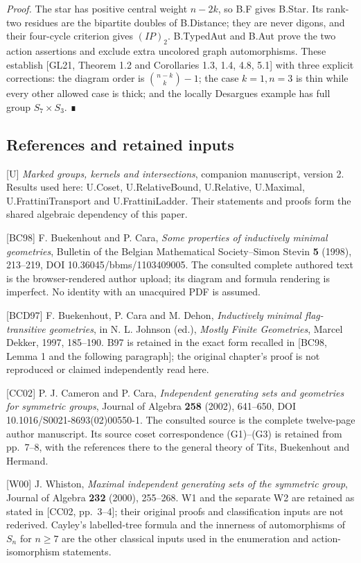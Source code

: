 \documentclass[
  11pt,
  a4paper,
]{article}
\begin{document}
\emph{Proof.} The star has positive central weight \(n-2k\), so B.F
gives B.Star. Its rank-two residues are the bipartite doubles of
B.Distance; they are never digons, and their four-cycle criterion gives
\((IP)_2\). B.TypedAut and B.Aut prove the two action assertions and
exclude extra uncolored graph automorphisms. These establish {[}GL21,
Theorem 1.2 and Corollaries 1.3, 1.4, 4.8, 5.1{]} with three explicit
corrections: the diagram order is \(\binom{n-k}{k}-1\); the case
\(k=1,n=3\) is thin while every other allowed case is thick; and the
locally Desargues example has full group \(S_7\times S_3\). ∎

\subsection{References and retained
inputs}\label{references-and-retained-inputs}

{[}U{]} \emph{Marked groups, kernels and intersections}, companion
manuscript, version 2. Results used here: U.Coset, U.RelativeBound,
U.Relative, U.Maximal, U.FrattiniTransport and U.FrattiniLadder. Their
statements and proofs form the shared algebraic dependency of this
paper.

{[}BC98{]} F. Buekenhout and P. Cara, \emph{Some properties of
inductively minimal geometries}, Bulletin of the Belgian Mathematical
Society--Simon Stevin \textbf{5} (1998), 213--219, DOI
10.36045/bbms/1103409005. The consulted complete authored text is the
browser-rendered author upload; its diagram and formula rendering is
imperfect. No identity with an unacquired PDF is assumed.

{[}BCD97{]} F. Buekenhout, P. Cara and M. Dehon, \emph{Inductively
minimal flag-transitive geometries}, in N. L. Johnson (ed.),
\emph{Mostly Finite Geometries}, Marcel Dekker, 1997, 185--190. B97 is
retained in the exact form recalled in {[}BC98, Lemma 1 and the
following paragraph{]}; the original chapter's proof is not reproduced
or claimed independently read here.

{[}CC02{]} P. J. Cameron and P. Cara, \emph{Independent generating sets
and geometries for symmetric groups}, Journal of Algebra \textbf{258}
(2002), 641--650, DOI 10.1016/S0021-8693(02)00550-1. The consulted
source is the complete twelve-page author manuscript. Its source coset
correspondence (G1)--(G3) is retained from pp.~7--8, with the references
there to the general theory of Tits, Buekenhout and Hermand.

{[}W00{]} J. Whiston, \emph{Maximal independent generating sets of the
symmetric group}, Journal of Algebra \textbf{232} (2000), 255--268. W1
and the separate W2 are retained as stated in {[}CC02, pp.~3--4{]};
their original proofs and classification inputs are not rederived.
Cayley's labelled-tree formula and the innerness of automorphisms of
\(S_n\) for \(n\geq7\) are the other classical inputs used in the
enumeration and action-isomorphism statements.
\end{document}
